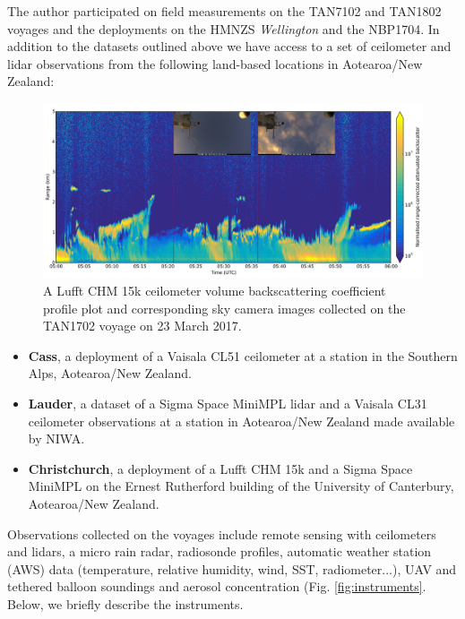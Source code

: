 \noindent
The author participated on field measurements on the TAN7102 and TAN1802 voyages and the deployments
on the HMNZS \textit{Wellington} and the NBP1704.
In addition to the datasets outlined above we have access to a set of
ceilometer and lidar observations from the following land-based locations in
Aotearoa/New Zealand:

\begin{figure}[t]
\includegraphics[width=\textwidth]{fig/chm15k_profile.png}
\caption{
A Lufft CHM 15k ceilometer volume backscattering coefficient profile plot
and corresponding sky camera images collected on the TAN1702 voyage
on 23 March 2017.
}
\label{fig:chm15k-profile}
\end{figure}

\begin{itemize}
\item \textbf{Cass}, a deployment of a Vaisala CL51 ceilometer at a station in the
Southern Alps, Aotearoa/New Zealand.
\item \textbf{Lauder}, a dataset of a Sigma Space MiniMPL lidar and a Vaisala CL31
ceilometer observations at a station in Aotearoa/New Zealand made available by NIWA.
\item \textbf{Christchurch}, a deployment of a Lufft CHM 15k and a Sigma Space MiniMPL on the
Ernest Rutherford building of the University of Canterbury, Aotearoa/New
Zealand.
\end{itemize}

Observations collected on the voyages include remote sensing with ceilometers and lidars,
a micro rain radar, radiosonde profiles, automatic weather station (AWS) data (temperature, relative humidity,
wind, SST, radiometer...), UAV and tethered balloon soundings and
aerosol concentration (Fig. \ref{fig:instruments}.
Below, we briefly describe the instruments.

